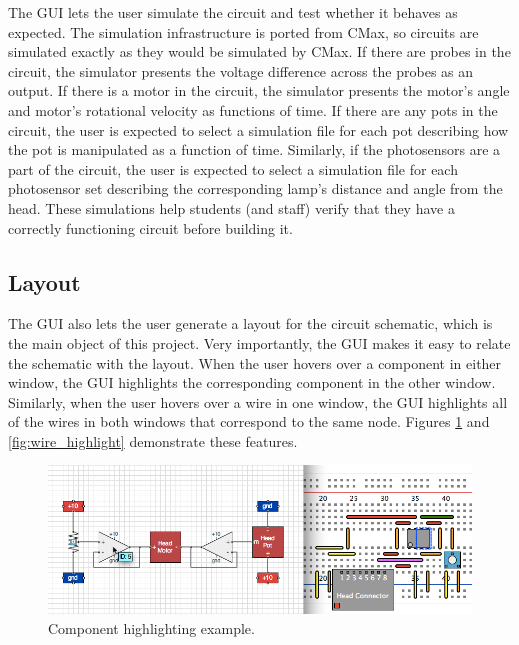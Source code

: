 The GUI lets the user simulate the circuit and test whether it behaves as
expected. The simulation infrastructure is ported from CMax, so circuits
are simulated exactly as they would be simulated by CMax.
If there are probes in the
circuit, the simulator presents the voltage difference across the probes as an
output. If there is a motor in the circuit, the simulator presents the motor's
angle and motor's rotational velocity as functions of time. If there are any
pots in the circuit, the user is expected to select a simulation file for each
pot describing how the pot is manipulated as a function of time. Similarly,
if the photosensors are a part of the circuit, the user is expected to select
a simulation file for each photosensor set describing the corresponding lamp's
distance and
angle from the head. These simulations help students (and staff) verify that
they have a correctly functioning circuit before building it.

\subsection{Layout}

The GUI also lets the user generate a layout for the circuit schematic, which is
the main object of this project. Very importantly, the GUI makes it easy to
relate the schematic with the layout. When the user hovers over a component in
either window, the GUI highlights the corresponding component in the other
window. Similarly, when the user hovers over a wire in one window, the GUI
highlights all
of the wires in both windows that correspond to the same node. Figures
\ref{fig:component_highlight} and \ref{fig:wire_highlight} demonstrate these
features.

\begin{figure}
\begin{center}
\includegraphics[width=\textwidth]{Images/gui_component_highlight.png}
\caption[GUI component highlighting example]{Component highlighting example.}
\label{fig:component_highlight}
\end{center}
\end{figure}

